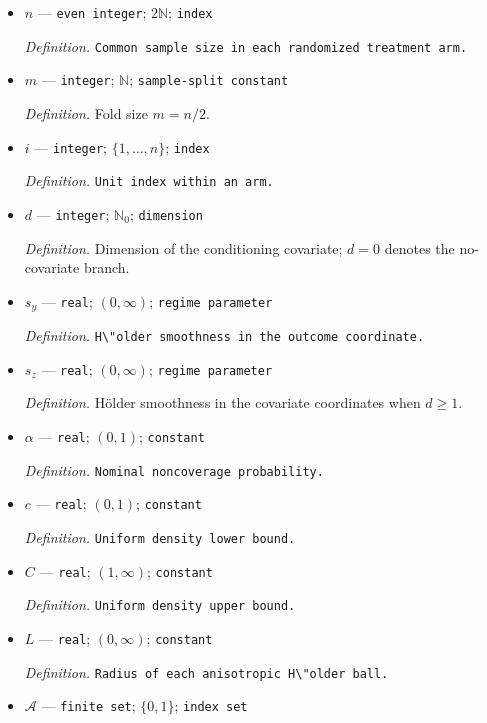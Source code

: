 \documentclass{article}
\begin{document}
\begin{itemize}
  \item \(n\) --- \texttt{even integer}; \(2\mathbb N\); \texttt{index}
  \par\smallskip\noindent\emph{Definition.} \texttt{Common sample size in each randomized treatment arm.}
  \item \(m\) --- \texttt{integer}; \(\mathbb N\); \texttt{sample-\allowbreak{}split constant}
  \par\smallskip\noindent\emph{Definition.} Fold size \(m=n/2\).
  \item \(i\) --- \texttt{integer}; \(\{1,\ldots,n\}\); \texttt{index}
  \par\smallskip\noindent\emph{Definition.} \texttt{Unit index within an arm.}
  \item \(d\) --- \texttt{integer}; \(\mathbb N_0\); \texttt{dimension}
  \par\smallskip\noindent\emph{Definition.} Dimension of the conditioning covariate; \(d=0\) denotes the no-covariate branch.
  \item \(s_y\) --- \texttt{real}; \((0,\infty)\); \texttt{regime parameter}
  \par\smallskip\noindent\emph{Definition.} \texttt{H\textbackslash{}\allowbreak{}"older smoothness in the outcome coordinate.}
  \item \(s_z\) --- \texttt{real}; \((0,\infty)\); \texttt{regime parameter}
  \par\smallskip\noindent\emph{Definition.} H\"older smoothness in the covariate coordinates when \(d\ge1\).
  \item \(\alpha\) --- \texttt{real}; \((0,1)\); \texttt{constant}
  \par\smallskip\noindent\emph{Definition.} \texttt{Nominal noncoverage probability.}
  \item \(c\) --- \texttt{real}; \((0,1)\); \texttt{constant}
  \par\smallskip\noindent\emph{Definition.} \texttt{Uniform density lower bound.}
  \item \(C\) --- \texttt{real}; \((1,\infty)\); \texttt{constant}
  \par\smallskip\noindent\emph{Definition.} \texttt{Uniform density upper bound.}
  \item \(L\) --- \texttt{real}; \((0,\infty)\); \texttt{constant}
  \par\smallskip\noindent\emph{Definition.} \texttt{Radius of each anisotropic H\textbackslash{}\allowbreak{}"older ball.}
  \item \(\mathcal A\) --- \texttt{finite set}; \(\{0,1\}\); \texttt{index set}

\end{itemize}
\end{document}
